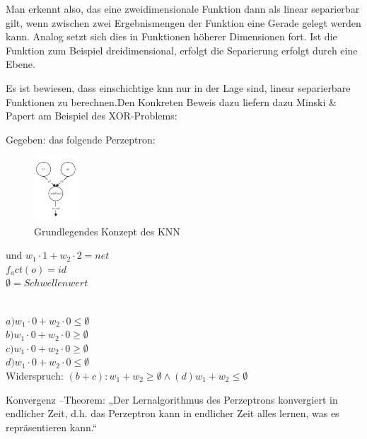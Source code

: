 Man erkennt also, das eine zweidimensionale Funktion dann als linear separierbar gilt, wenn zwischen zwei Ergebnismengen der Funktion eine Gerade gelegt werden kann. Analog setzt sich dies in Funktionen höherer Dimensionen fort. Ist die Funktion zum Beispiel dreidimensional, erfolgt die Separierung erfolgt durch eine Ebene.

Es ist bewiesen, dass einschichtige \acs{knn} nur in der Lage sind, linear separierbare Funktionen zu berechnen.Den Konkreten Beweis dazu liefern dazu Minski \& Papert am Beispiel des XOR-Problems:

\begin{bew}
Gegeben:
das folgende Perzeptron:

\begin{figure}[H]
\centering
		\includegraphics[width=0.15\textwidth]{Perzeptron.PNG}
	\caption{Grundlegendes Konzept des KNN}
	\label{fig:Grundlegendes Konzept des KNN}
\end{figure}

und
$w_1\cdot1 + w_2\cdot2 = net$\\ 
$f_act(o) = id$ \\
$\emptyset = Schwellenwert$\\\

$a) w_1\cdot0 + w_2\cdot0 \le \emptyset$\\
$b) w_1\cdot0 + w_2\cdot0 \geq \emptyset$\\
$c) w_1\cdot0 + w_2\cdot0 \geq \emptyset$\\
$d) w_1\cdot0 + w_2\cdot0 \le \emptyset$\\
 
Widerspruch: $(b+c):  w_1 + w_2 \geq \emptyset  \wedge (d)  w_1 + w_2 \leq \emptyset$ 
 
\end{bew}

\begin{theo}
Konvergenz –Theorem:
   „Der Lernalgorithmus des Perzeptrons konvergiert in endlicher Zeit, d.h. das Perzeptron kann in endlicher Zeit alles lernen, was es repräsentieren                          
   kann.“
\end{theo}

